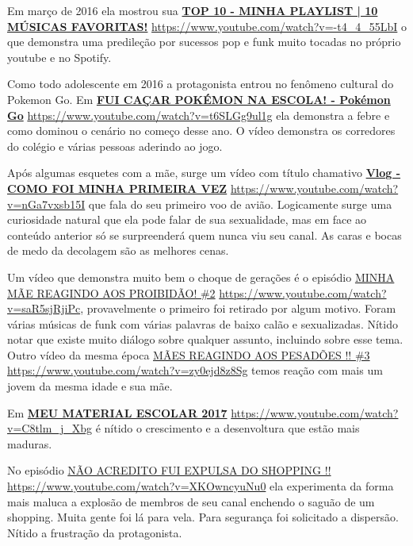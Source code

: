 Em março de 2016 ela mostrou sua \href{https://www.youtube.com/watch?v=-t4_4_55LbI}{\textbf{TOP 10 - MINHA PLAYLIST | 10 MÚSICAS FAVORITAS!}} \url{https://www.youtube.com/watch?v=-t4_4_55LbI} o que demonstra uma predileção por sucessos pop e funk muito tocadas no próprio youtube e no Spotify.

Como todo adolescente em 2016 a protagonista entrou no fenômeno cultural do Pokemon Go. Em \href{https://www.youtube.com/watch?v=t6SLGg9ul1g}{\textbf{FUI CAÇAR POKÉMON NA ESCOLA! - Pokémon Go}} \url{https://www.youtube.com/watch?v=t6SLGg9ul1g} ela demonstra a febre e como dominou o cenário no começo desse ano. O vídeo demonstra os corredores do colégio e várias pessoas aderindo ao jogo.

Após algumas esquetes com a mãe, surge um vídeo com título chamativo \href{https://www.youtube.com/watch?v=nGa7vxsb15I}{\textbf{Vlog - COMO FOI MINHA PRIMEIRA VEZ}} \url{https://www.youtube.com/watch?v=nGa7vxsb15I} que fala do seu primeiro voo de avião. Logicamente surge uma curiosidade natural que ela pode falar de sua sexualidade, mas em face ao conteúdo anterior só se surpreenderá quem nunca viu seu canal. As caras e bocas de medo da decolagem são as melhores cenas.

Um vídeo que demonstra muito bem o choque de gerações é o episódio \href{https://www.youtube.com/watch?v=saR5sjRjiPc}{MINHA MÃE REAGINDO AOS PROIBIDÃO! \#2}
 \url{https://www.youtube.com/watch?v=saR5sjRjiPc}, provavelmente o primeiro foi retirado por algum motivo. Foram várias músicas de funk com várias palavras de baixo calão e sexualizadas. Nítido notar que existe muito diálogo sobre qualquer assunto, incluindo sobre esse tema. Outro vídeo da mesma época \href{https://www.youtube.com/watch?v=zy0ejd8z8Sg}{MÃES REAGINDO AOS PESADÕES !! \#3} \url{https://www.youtube.com/watch?v=zy0ejd8z8Sg} temos reação com mais um jovem da mesma idade e sua mãe.

Em \href{https://www.youtube.com/watch?v=C8tlm_j_Xbg}{\textbf{MEU MATERIAL ESCOLAR 2017}} \url{https://www.youtube.com/watch?v=C8tlm_j_Xbg} é nítido o crescimento e a desenvoltura que estão mais maduras.

No episódio \href{https://www.youtube.com/watch?v=XKOwncyuNu0}{NÃO ACREDITO FUI EXPULSA DO SHOPPING !!} \url{https://www.youtube.com/watch?v=XKOwncyuNu0} ela experimenta da forma mais maluca a explosão de membros de seu canal enchendo o saguão de um shopping. Muita gente foi lá para vela. Para segurança foi solicitado a dispersão. Nítido a frustração da protagonista.

